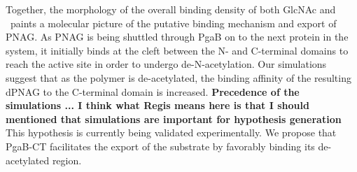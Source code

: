 Together, the morphology of the overall binding density of both GlcNAc and \glucosamine\ paints a molecular picture of the putative binding mechanism and export of PNAG. As PNAG is being shuttled through PgaB on to the next protein in the system, it initially binds at the cleft between the N- and C-terminal domains to reach the active site in order to undergo de-N-acetylation. Our simulations suggest that as the polymer is de-acetylated, the binding affinity of the resulting dPNAG to the C-terminal domain is increased. \textbf{Precedence of the simulations ... I think what Regis means here is that I should mentioned that simulations are important for hypothesis generation} This hypothesis is currently being validated experimentally. We propose that PgaB-CT facilitates the export of the substrate by favorably binding its de-acetylated region. 

 

